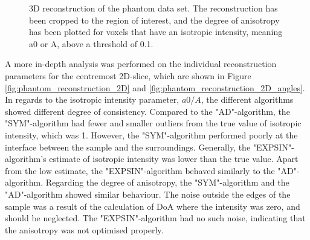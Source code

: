 \begin{figure}[h!]
    
    \caption{ 3D reconstruction of the phantom data set.
        The reconstruction has been cropped to the region of interest,
        and the degree of anisotropy has been plotted for voxels that have an isotropic intensity, meaning a0 or A, above a threshold of 0.1. }
    \label{fig:phantom_reconstruction_3D}
\end{figure}

\clearpage
A more in-depth analysis was performed on
the individual reconstruction parameters for the centremost 2D-slice, which are shown in Figure \ref{fig:phantom_reconstruction_2D} and \ref{fig:phantom_reconstruction_2D_angles}. %
In regards to the isotropic intensity parameter, $a0/A$, the different algorithms showed different degree of consistency.
Compared to the "AD"-algorithm, the "SYM"-algorithm had fewer and smaller outliers from the true value of isotropic intensity, which was 1.
However, the "SYM"-algorithm performed poorly at the interface between the sample and the surroundings.
Generally, the "EXPSIN"-algorithm's estimate of isotropic intensity was lower than the true value.
Apart from the low estimate, the "EXPSIN"-algorithm behaved similarly to the "AD"-algorithm.
Regarding the degree of anisotropy, the "SYM"-algorithm and the "AD"-algorithm showed similar behaviour.
The noise outside the edges of the sample was a result of the calculation of DoA where the intensity was zero, and should be neglected.
The "EXPSIN"-algorithm had no such noise, indicating that the anisotropy was not optimised properly.



